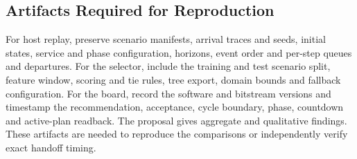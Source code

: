\subsection{Artifacts Required for Reproduction}
For host replay, preserve scenario manifests, arrival traces and seeds, initial states, service and phase configuration, horizons, event order and per-step queues and departures. For the selector, include the training and test scenario split, feature window, scoring and tie rules, tree export, domain bounds and fallback configuration. For the board, record the software and bitstream versions and timestamp the recommendation, acceptance, cycle boundary, phase, countdown and active-plan readback. The proposal gives aggregate and qualitative findings. These artifacts are needed to reproduce the comparisons or independently verify exact handoff timing.
